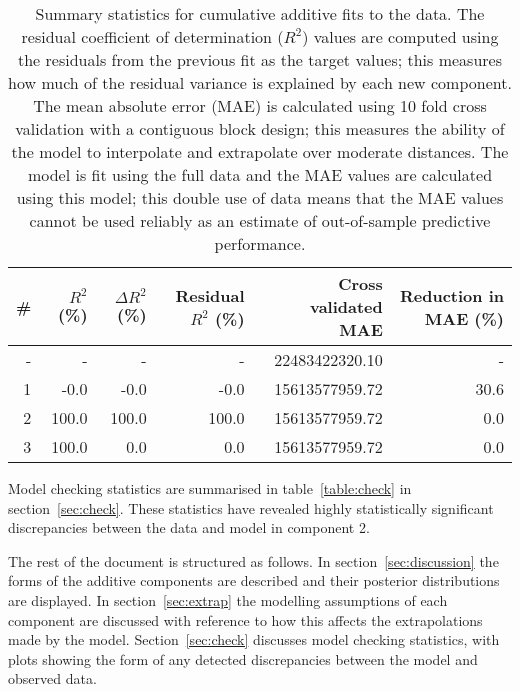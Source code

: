 \documentclass{article} %
\begin{document}
\begin{table}[htb]
\begin{center}
{\small
\begin{tabular}{|r|rrrrr|}
\hline
\bf{\#} & {$R^2$ (\%)} & {$\Delta R^2$ (\%)} & {Residual $R^2$ (\%)} & {Cross validated MAE} & Reduction in MAE (\%)\\
\hline
- & - & - & - & 22483422320.10 & -\\

1 & -0.0 & -0.0 & -0.0 & 15613577959.72 & 30.6\\

2 & 100.0 & 100.0 & 100.0 & 15613577959.72 & 0.0\\

3 & 100.0 & 0.0 & 0.0 & 15613577959.72 & 0.0\\

\hline
\end{tabular}
\caption{
Summary statistics for cumulative additive fits to the data.
The residual coefficient of determination ($R^2$) values are computed using the residuals from the previous fit as the target values; this measures how much of the residual variance is explained by each new component.
The mean absolute error (MAE) is calculated using 10 fold cross validation with a contiguous block design; this measures the ability of the model to interpolate and extrapolate over moderate distances.
The model is fit using the full data and the MAE values are calculated using this model; this double use of data means that the MAE values cannot be used reliably as an estimate of out-of-sample predictive performance.
}
\label{table:stats}
}
\end{center}
\end{table}

Model checking statistics are summarised in table~\ref{table:check} in section~\ref{sec:check}.
These statistics have revealed highly statistically significant discrepancies between the data and model in component 2.

The rest of the document is structured as follows.
In section~\ref{sec:discussion} the forms of the additive components are described and their posterior distributions are displayed.
In section~\ref{sec:extrap} the modelling assumptions of each component are discussed with reference to how this affects the extrapolations made by the model.
Section~\ref{sec:check} discusses model checking statistics, with plots showing the form of any detected discrepancies between the model and observed data.
\end{document}
